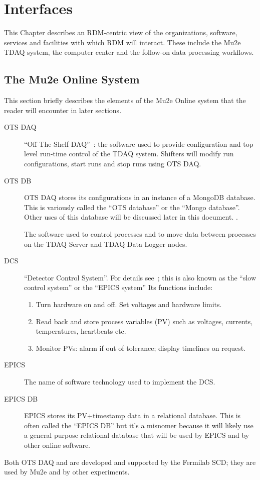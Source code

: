 \chapter{Interfaces}
\label{ch:SelectedDetails}
This Chapter describes an RDM-centric view of the organizations, software, services and facilities
with which RDM will interact.  These include the Mu2e TDAQ system,
the computer center and the follow-on data processing workflows.

\section{The Mu2e Online System}
\label{sec:Mu2eOnlineSystem}

This section briefly describes the elements of the Mu2e Online system that the reader will encounter in later sections.

\begin{description}
\item[OTS DAQ] ``Off-The-Shelf DAQ''~\cite{MU2EOTSDAQ}: the software used to provide configuration and top level run-time control of the TDAQ system.
  Shifters will modify run configurations, start runs and stop runs using OTS DAQ.
\item[OTS DB] OTS DAQ stores its configurations in an instance of a MongoDB database.  This is variously called the ``OTS database'' or the ``Mongo database''.
  Other uses of this database will be discussed later in this document. .
\item[\artdaq] The software used to control processes and to move data between processes on the TDAQ Server and TDAQ Data Logger nodes.
\item[DCS] ``Detector Control System''.
  For details see~\cite{DCSSpec};
  this is also known as the ``slow control system'' or the ``EPICS system''
  Its functions include:
  \begin{enumerate}
    \item Turn hardware on and off. Set voltages and hardware limits.
    \item Read back and store process variables (PV) such as voltages, currents, temperatures, heartbeats etc.
    \item Monitor PVs: alarm if out of tolerance; display timelines on request.
  \end{enumerate}
\item[EPICS] The name of software technology used to implement the DCS.
\item[EPICS DB] EPICS stores its PV+timestamp data in a relational database.
  This is often called the ``EPICS DB'' but it's a misnomer because it will likely use
  a general purpose relational database that will be used by EPICS
  and by other online software.
\end{description}
Both OTS DAQ and \artdaq are developed and supported by the Fermilab SCD;
they are used by Mu2e and by other experiments.


